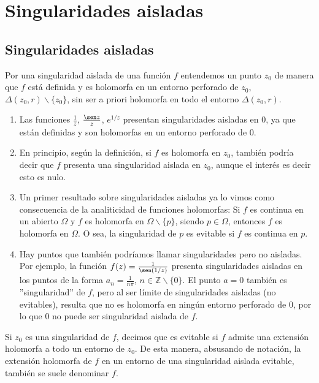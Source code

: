\chapter{Singularidades aisladas}

\section{Singularidades aisladas}

\begin{defi}
Por una singularidad aislada de una función $f$ entendemos un punto $z_0$ de manera que $f$ está definida y es holomorfa en un entorno perforado de $z_0$, $\Delta(z_0,r) \backslash \{z_0\}$, sin ser a priori holomorfa en todo el entorno $\Delta(z_0,r)$.
\end{defi}

\begin{ejemplo}
\begin{enumerate}
    \item Las funciones $\frac{1}{z}$, $\frac{\sen z}{z}$, $e^{1/z}$ presentan singularidades aisladas en 0, ya que están definidas y son holomorfas en un entorno perforado de 0.
    \item En principio, según la definición, si $f$ es holomorfa en $z_0$, también podría decir que $f$ presenta una singularidad aislada en $z_0$, aunque el interés es decir esto es nulo.
    \item Un primer resultado sobre singularidades aisladas ya lo vimos como consecuencia de la analiticidad de funciones holomorfas: Si $f$ es continua en un abierto $\Omega$ y $f$ es holomorfa en $\Omega \backslash \{p\}$, siendo $p \in \Omega$, entonces $f$ es holomorfa en $\Omega$. O sea, la singularidad de $p$ es evitable si $f$ es continua en $p$.
    \item Hay puntos que también podríamos llamar singularidades pero no aisladas. Por ejemplo, la función $f(z) = \frac{1}{\sen (1/z)}$ presenta singularidades aisladas en los puntos de la forma $a_n = \frac{1}{n\pi}$, $n \in \mathbb{Z} \backslash \{0\}$. El punto $a = 0$ también es ''singularidad'' de $f$, pero al ser límite de singularidades aisladas (no evitables), resulta que no es holomorfa en ningún entorno perforado de 0, por lo que 0 no puede ser singularidad aislada de $f$.
\end{enumerate}
\end{ejemplo}

\begin{defi}
Si $z_0$ es una singularidad de $f$, decimos que es evitable si $f$ admite una extensión holomorfa a todo un entorno de $z_0$. De esta manera, absusando de notación, la extensión holomorfa de $f$ en un entorno de una singularidad aislada evitable, también se suele denominar $f$.
\end{defi}

